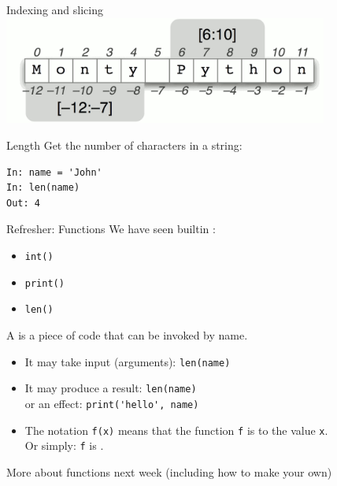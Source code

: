 \documentclass[aspectratio=169,usenames,dvipsnames]{beamer}
\begin{document}
\begin{frame}{Indexing and slicing}
    \includegraphics[width=0.8\textwidth]{fig/slices}
\end{frame}

\begin{frame}[fragile]{Length}
Get the number of characters in a string:
\begin{lstlisting}
In: name = 'John'
In: len(name)
Out: 4
\end{lstlisting}
\end{frame}

\begin{frame}{Refresher: Functions}
    We have seen builtin :
    \begin{itemize}
        \item \lstinline{int()}
        \item \lstinline{print()}
        \item \lstinline{len()}
    \end{itemize}
    \pause
    \begin{definition}
        A  is a piece of code
        that can be invoked by name.

    \begin{itemize}
        \item It may take input (arguments): \lstinline{len(name)}
        
        \item It may produce a result: \lstinline{len(name)} \\
            or an effect: \lstinline{print('hello', name)}

        \item The notation \lstinline{f(x)} means that the function \lstinline{f}
            is  to the value \lstinline{x}. \\ 
            Or simply: \lstinline{f} is .
    \end{itemize}
    \end{definition}
    \pause
    More about functions next week (including how to make your own)
\end{frame}
\end{document}
